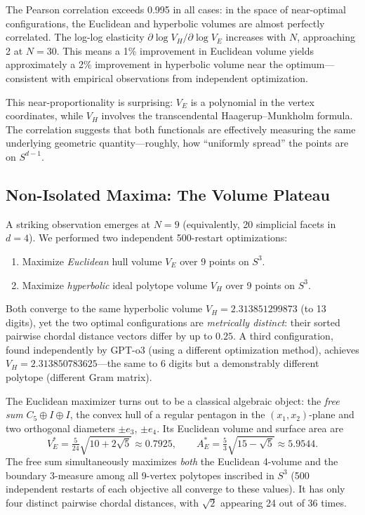 \documentclass[11pt]{article}
\begin{document}
The Pearson correlation exceeds 0.995 in all cases: in the space of
near-optimal configurations, the Euclidean and hyperbolic volumes are
almost perfectly correlated. The log-log elasticity
$\partial \log V_H / \partial \log V_E$ increases with $N$,
approaching 2 at $N = 30$. This means a 1\% improvement in
Euclidean volume yields approximately a 2\% improvement in
hyperbolic volume near the optimum---consistent with empirical
observations from independent optimization.

This near-proportionality is surprising: $V_E$ is a polynomial in
the vertex coordinates, while $V_H$ involves the transcendental
Haagerup--Munkholm formula. The correlation suggests that both
functionals are effectively measuring the same underlying geometric
quantity---roughly, how ``uniformly spread'' the points are on
$S^{d-1}$.

\subsection{Non-Isolated Maxima: The Volume Plateau}

A striking observation emerges at $N = 9$ (equivalently, 20 simplicial facets
in $d = 4$). We performed two independent 500-restart optimizations:
\begin{enumerate}[label=(\roman*)]
\item Maximize \emph{Euclidean} hull volume $V_E$ over 9 points on $S^3$.
\item Maximize \emph{hyperbolic} ideal polytope volume $V_H$ over 9 points on $S^3$.
\end{enumerate}
Both converge to the same hyperbolic volume
$V_H = 2.313851299873$ (to 13 digits), yet the two
optimal configurations are \emph{metrically distinct}: their sorted
pairwise chordal distance vectors differ by up to $0.25$.
A third configuration, found independently by GPT-o3
(using a different optimization method), achieves
$V_H = 2.313850783625$---the same to 6 digits but a demonstrably
different polytope (different Gram matrix).

The Euclidean maximizer turns out to be a classical algebraic object:
the \emph{free sum} $C_5 \oplus I \oplus I$, the convex hull of a
regular pentagon in the $(x_1,x_2)$-plane and two orthogonal diameters
$\pm e_3$, $\pm e_4$.  Its Euclidean volume and surface area are
\[
V_E^* = \tfrac{5}{24}\sqrt{10 + 2\sqrt{5}}
      \approx 0.7925,
\qquad
A_E^* = \tfrac{5}{3}\sqrt{15 - \sqrt{5}}
      \approx 5.9544.
\]
The free sum simultaneously maximizes \emph{both} the Euclidean
4-volume and the boundary 3-measure among all 9-vertex polytopes
inscribed in $S^3$ (500 independent restarts of each objective
all converge to these values).  It has only four distinct pairwise
chordal distances, with $\sqrt{2}$ appearing 24 out of 36 times.
\end{document}
